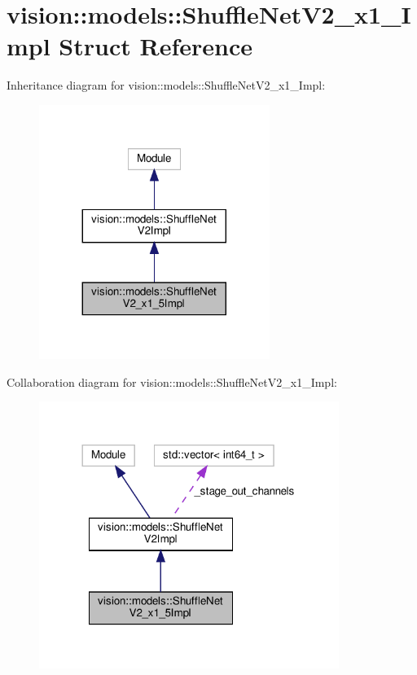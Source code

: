 \hypertarget{structvision_1_1models_1_1ShuffleNetV2__x1__5Impl}{}\section{vision\+:\+:models\+:\+:Shuffle\+Net\+V2\+\_\+x1\+\_\+Impl Struct Reference}
\label{structvision_1_1models_1_1ShuffleNetV2__x1__5Impl}


Inheritance diagram for vision\+:\+:models\+:\+:Shuffle\+Net\+V2\+\_\+x1\+\_\+Impl\+:
\nopagebreak
\begin{figure}[H]
\begin{center}
\leavevmode
\includegraphics[width=212pt]{structvision_1_1models_1_1ShuffleNetV2__x1__5Impl__inherit__graph}
\end{center}
\end{figure}


Collaboration diagram for vision\+:\+:models\+:\+:Shuffle\+Net\+V2\+\_\+x1\+\_\+Impl\+:
\nopagebreak
\begin{figure}[H]
\begin{center}
\leavevmode
\includegraphics[width=276pt]{structvision_1_1models_1_1ShuffleNetV2__x1__5Impl__coll__graph}
\end{center}
\end{figure}

